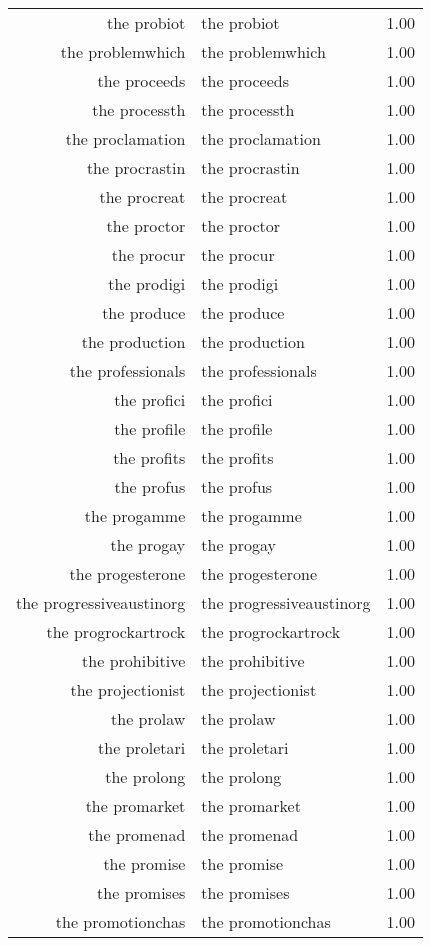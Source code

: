 \begin{table}[ht]
\begin{tabular}{rlr}
  the probiot & the probiot & 1.00 \\ 
  the problemwhich & the problemwhich & 1.00 \\ 
  the proceeds & the proceeds & 1.00 \\ 
  the processth & the processth & 1.00 \\ 
  the proclamation & the proclamation & 1.00 \\ 
  the procrastin & the procrastin & 1.00 \\ 
  the procreat & the procreat & 1.00 \\ 
  the proctor & the proctor & 1.00 \\ 
  the procur & the procur & 1.00 \\ 
  the prodigi & the prodigi & 1.00 \\ 
  the produce & the produce & 1.00 \\ 
  the production & the production & 1.00 \\ 
  the professionals & the professionals & 1.00 \\ 
  the profici & the profici & 1.00 \\ 
  the profile & the profile & 1.00 \\ 
  the profits & the profits & 1.00 \\ 
  the profus & the profus & 1.00 \\ 
  the progamme & the progamme & 1.00 \\ 
  the progay & the progay & 1.00 \\ 
  the progesterone & the progesterone & 1.00 \\ 
  the progressiveaustinorg & the progressiveaustinorg & 1.00 \\ 
  the progrockartrock & the progrockartrock & 1.00 \\ 
  the prohibitive & the prohibitive & 1.00 \\ 
  the projectionist & the projectionist & 1.00 \\ 
  the prolaw & the prolaw & 1.00 \\ 
  the proletari & the proletari & 1.00 \\ 
  the prolong & the prolong & 1.00 \\ 
  the promarket & the promarket & 1.00 \\ 
  the promenad & the promenad & 1.00 \\ 
  the promise & the promise & 1.00 \\ 
  the promises & the promises & 1.00 \\ 
  the promotionchas & the promotionchas & 1.00 \\ 

\end{tabular}
\end{table}
